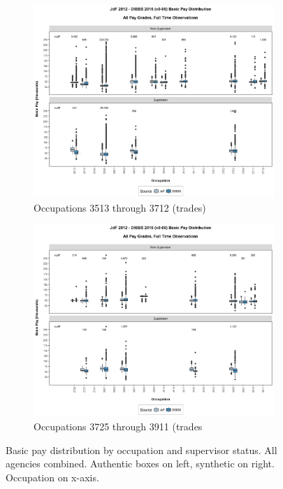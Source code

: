 \documentclass[10pt, letterpaper]{article}
\begin{document}
\begin{spacing}{1.0}
\clearpage

\begin{figure}[h]
    \centering
    \begin{subfigure}{1\textwidth}
        \centering
        \includegraphics[width=6in, trim={0 1in 0 0.75in}, clip]{JdFDIBBSBasicPaySupervisoryStatusOccupation521.png}
        \caption{Occupations 3513 through 3712 (trades)}
        \vspace{10pt}
    \end{subfigure}
    \begin{subfigure}{1\textwidth}
        \centering
        \includegraphics[width=6in, trim={0 1in 0 0.75in}, clip]{JdFDIBBSBasicPaySupervisoryStatusOccupation541.png}
        \caption{Occupations 3725 through 3911 (trades}
        \vspace{10pt}
    \end{subfigure}
    \caption{Basic pay distribution by occupation and supervisor status.  All agencies combined.  Authentic boxes on left, synthetic on right.  Occupation on x-axis.}
    \label{figure:JdFDIBBSBasicPaySupervisoryStatusOccupation5}
\end{figure}


\end{spacing}
\end{document}

